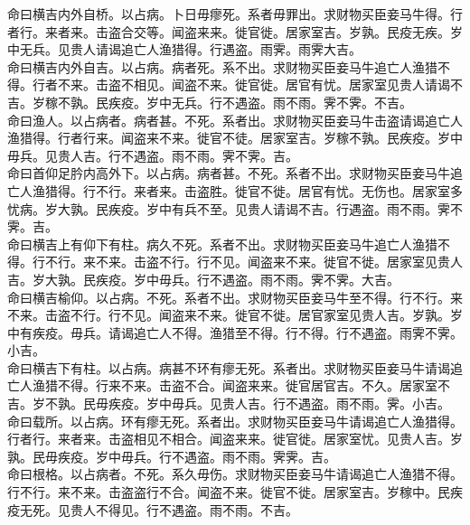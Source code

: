 \documentclass{zhvt-classic}
\begin{document}
\hspace*{2em}命曰横吉内外自桥。以占病。卜日毋瘳死。系者毋罪出。求财物买臣妾马牛得。行者行。来者来。击盗合交等。闻盗来来。徙官徙。居家室吉。岁孰。民疫无疾。岁中无兵。见贵人请谒追亡人渔猎得。行遇盗。雨霁。雨霁大吉。\\
\hspace*{2em}命曰横吉内外自吉。以占病。病者死。系不出。求财物买臣妾马牛追亡人渔猎不得。行者不来。击盗不相见。闻盗不来。徙官徙。居官有忧。居家室见贵人请谒不吉。岁稼不孰。民疾疫。岁中无兵。行不遇盗。雨不雨。霁不霁。不吉。\\
\hspace*{2em}命曰渔人。以占病者。病者甚。不死。系者出。求财物买臣妾马牛击盗请谒追亡人渔猎得。行者行来。闻盗来不来。徙官不徒。居家室吉。岁稼不孰。民疾疫。岁中毋兵。见贵人吉。行不遇盗。雨不雨。霁不霁。吉。\\
\hspace*{2em}命曰首仰足肣内高外下。以占病。病者甚。不死。系者不出。求财物买臣妾马牛追亡人渔猎得。行不行。来者来。击盗胜。徙官不徙。居官有忧。无伤也。居家室多忧病。岁大孰。民疾疫。岁中有兵不至。见贵人请谒不吉。行遇盗。雨不雨。霁不霁。吉。\\
\hspace*{2em}命曰横吉上有仰下有柱。病久不死。系者不出。求财物买臣妾马牛追亡人渔猎不得。行不行。来不来。击盗不行。行不见。闻盗来不来。徙官不徙。居家室见贵人吉。岁大孰。民疾疫。岁中毋兵。行不遇盗。雨不雨。霁不霁。大吉。\\
\hspace*{2em}命曰横吉榆仰。以占病。不死。系者不出。求财物买臣妾马牛至不得。行不行。来不来。击盗不行。行不见。闻盗来不来。徙官不徙。居官家室见贵人吉。岁孰。岁中有疾疫。毋兵。请谒追亡人不得。渔猎至不得。行不得。行不遇盗。雨霁不霁。小吉。\\
\hspace*{2em}命曰横吉下有柱。以占病。病甚不环有瘳无死。系者出。求财物买臣妾马牛请谒追亡人渔猎不得。行来不来。击盗不合。闻盗来来。徙官居官吉。不久。居家室不吉。岁不孰。民毋疾疫。岁中毋兵。见贵人吉。行不遇盗。雨不雨。霁。小吉。\\
\hspace*{2em}命曰载所。以占病。环有瘳无死。系者出。求财物买臣妾马牛请谒追亡人渔猎得。行者行。来者来。击盗相见不相合。闻盗来来。徙官徙。居家室忧。见贵人吉。岁孰。民毋疾疫。岁中毋兵。行不遇盗。雨不雨。霁霁。吉。\\
\hspace*{2em}命曰根格。以占病者。不死。系久毋伤。求财物买臣妾马牛请谒追亡人渔猎不得。行不行。来不来。击盗盗行不合。闻盗不来。徙官不徙。居家室吉。岁稼中。民疾疫无死。见贵人不得见。行不遇盗。雨不雨。不吉。\\
\end{document}
